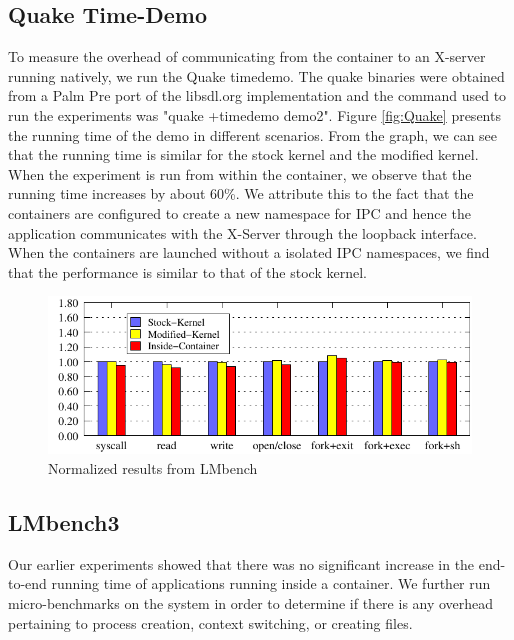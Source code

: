 \subsection{Quake Time-Demo}
\label{sec:quake_demo}
To measure the overhead of communicating from the container to an X-server running natively, we run the Quake timedemo. The quake binaries were obtained from a Palm Pre port of the libsdl.org implementation and the command used to run the experiments was "quake +timedemo demo2". Figure \ref{fig:Quake} presents the running time of the demo in different scenarios. From the graph, we can see that the running time is similar for the stock kernel and the modified kernel. When the experiment is run from within the container, we observe that the running time increases by about 60\%. We attribute this to the fact that the containers are configured to create a new namespace for IPC and hence the application communicates with the X-Server through the loopback interface. When the containers are launched without a isolated IPC namespaces, we find that the performance is similar to that of the stock kernel.

\begin{figure}[bth]
\centering
\includegraphics[width=2.0\columnwidth]{lmbench}
\caption{Normalized results from LMbench}
\label{fig:lmbench}
\end{figure}

\subsection{LMbench3} 
\label{sec:LMbench3}
Our earlier experiments showed that there was no significant increase in the end-to-end running time of applications running inside a container.  We further run micro-benchmarks on the system in order to determine if there is any overhead pertaining to process creation, context switching, or creating files.

